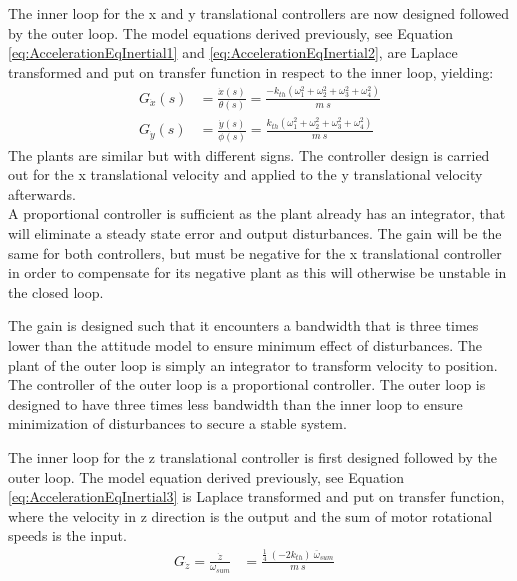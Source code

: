 The inner loop for the x and y translational controllers are now designed followed by the outer loop.
The model equations derived previously, see Equation \ref{eq:AccelerationEqInertial1} and \ref{eq:AccelerationEqInertial2}, are Laplace transformed and put on transfer function in respect to the inner loop, yielding:
\begin{align}
    G_{\dot{x}}(s)&=\frac{\dot{x} (s)}{\theta (s)}=\frac{-k_{th} (\omega_1 ^2 + \omega_2 ^2 + \omega_3 ^2 + \omega_4 ^2)}{m\ s} \\
    G_{\dot{y}}(s)&=\frac{\dot{y} (s)}{\phi (s)}=\frac{k_{th}(\omega_1 ^2 + \omega_2 ^2 + \omega_3 ^2 + \omega_4 ^2)}{m\ s} 
\end{align}
%
The plants are similar but with different signs. The controller design is carried out for the x translational velocity and applied to the y translational velocity afterwards.\\
A proportional controller is sufficient as the plant already has an integrator, that will eliminate a steady state error and output disturbances. The gain will be the same for both controllers, but must be negative for the x translational controller in order to compensate for its negative plant as this will otherwise be unstable in the closed loop.

The gain is designed such that it encounters a bandwidth that is three times lower than the attitude model to ensure minimum effect of disturbances.
The plant of the outer loop is simply an integrator to transform velocity to position. The controller of the outer loop is a proportional controller. The outer loop is designed to have three times less bandwidth than the inner loop to ensure minimization of disturbances to secure a stable system.

The inner loop for the z translational controller is first designed followed by the outer loop.
The model equation derived previously, see Equation \ref{eq:AccelerationEqInertial3} is Laplace transformed and put on transfer function, where the velocity in z direction is the output and the sum of motor rotational speeds is the input.
\begin{align}
G_{\dot{z}}=\frac{\dot{z}}{\omega_{sum}} &= \frac{ \frac{1}{4}\ (-2 k_{th})\ \overline{\omega}_{sum} }{ m\ s } & \label{eq:linearTransferFunctionZ}
\end{align}

